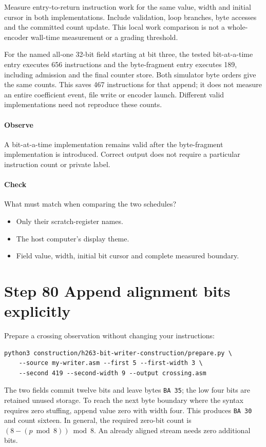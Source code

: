 Measure entry-to-return instruction work for the same value, width and initial
cursor in both implementations. Include validation, loop branches, byte accesses
and the committed count update. This local work comparison is not a whole-encoder
wall-time measurement or a grading threshold.

For the named all-one 32-bit field starting at bit three, the tested bit-at-a-time
entry executes 656 instructions and the byte-fragment entry executes 189, including
admission and the final counter store. Both simulator byte orders give the same
counts. This saves 467 instructions for that append; it does not measure an entire
coefficient event, file write or encoder launch. Different valid implementations
need not reproduce these counts.

\paragraph{Observe} A bit-at-a-time implementation remains valid after the
byte-fragment implementation is introduced. Correct output does not require a
particular instruction count or private label.
\paragraph{Check} What must match when comparing the two schedules?
\begin{itemize}
  \item[A.] Only their scratch-register names.
  \item[B.] The host computer's display theme.
  \item[C.] Field value, width, initial bit cursor and complete measured boundary.
\end{itemize}

\section{Step 80 Append alignment bits explicitly}\label{h263-writer-s10}
Prepare a crossing observation without changing your instructions:
\begin{verbatim}
python3 construction/h263-bit-writer-construction/prepare.py \
    --source my-writer.asm --first 5 --first-width 3 \
    --second 419 --second-width 9 --output crossing.asm
\end{verbatim}
The two fields commit twelve bits and leave bytes \texttt{BA 35}; the low four
bits are retained unused storage. To reach the next byte boundary where the
syntax requires zero stuffing, append value zero with width four. This produces
\texttt{BA 30} and count sixteen. In general, the required zero-bit count is
$(8-(p\bmod8))\bmod8$. An already aligned stream needs zero additional bits.

